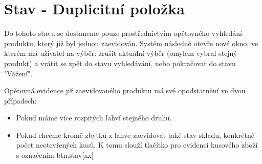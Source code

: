 
\section{Stav - Duplicitní položka}


Do tohoto stavu se dostaneme pouze prostřednictvím opětovného vyhledání produktu, který již byl jednou zaevidován. Systém následně otevře nové okno, ve kterém má uživatel na výběr: zrušit aktuální výběr (omylem vybral stejný produkt) a vrátit se zpět do stavu vyhledávání, nebo pokračovat do stavu "Vážení".


Opětovná evidence již zaevidovaného produktu má své opodstatnění ve dvou případech:
\begin{itemize}
    \item Pokud máme více rozpitých lahví stejného druhu.
    \item Pokud chceme kromě zbytku z lahve zaevidovat také stav skladu, konkrétně počet neotevřených kusů. K tomu slouží tlačítko pro evidenci kusového zboží s označením btn.stav[xx]
\end{itemize}

